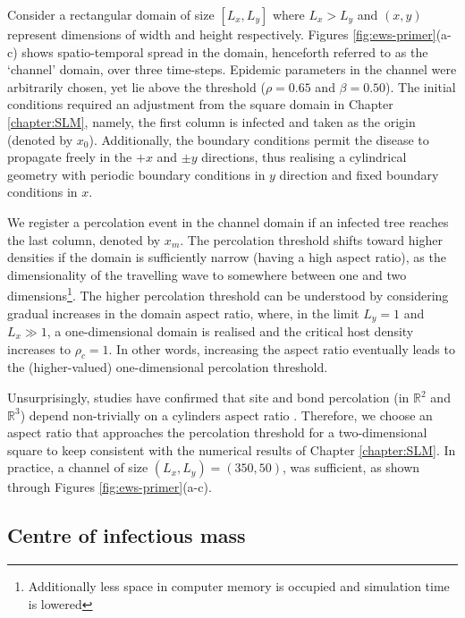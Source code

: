 Consider a rectangular domain of size $[L_x, L_y]$ where $L_x>L_y$ and $(x, y)$ represent dimensions of width and height respectively.
Figures \ref{fig:ews-primer}(a-c) shows spatio-temporal spread in the domain, henceforth referred to as the `channel' domain, over three time-steps.
Epidemic parameters in the channel were arbitrarily chosen, yet lie above the threshold ($\rho=0.65$ and $\beta=0.50$).
The initial conditions required an adjustment from the square domain in Chapter \ref{chapter:SLM}, namely, the first column is infected and taken as the origin (denoted by $x_0$).
Additionally, the boundary conditions permit the disease to propagate freely in the $+x$ and $\pm y$ directions, thus realising a cylindrical geometry with periodic boundary conditions in $y$ direction and fixed boundary conditions in $x$.

We register a percolation event in the channel domain if an infected tree reaches the last column, denoted by $x_m$.
The percolation threshold shifts toward higher densities if the domain is sufficiently narrow (having a high aspect ratio), as the dimensionality of the travelling wave to somewhere between one and two dimensions\footnote{Additionally less space in computer memory is occupied and simulation time is lowered}. 
The higher percolation threshold can be understood by considering gradual increases in the domain aspect ratio, 
where, in the limit $L_y = 1$ and $L_x \gg 1$, a one-dimensional domain is realised and the critical host density increases to $\rho_c=1$.
In other words, increasing the aspect ratio eventually leads to the (higher-valued) one-dimensional percolation threshold.

Unsurprisingly, studies have confirmed that site and bond percolation (in $\mathbb{R}^2$ and  $\mathbb{R}^3$) depend non-trivially on a cylinders aspect ratio \cite{sangare2009continuum}.
Therefore, we choose an aspect ratio that approaches the percolation threshold for a two-dimensional square to keep consistent with the numerical results of Chapter \ref{chapter:SLM}. 
In practice, a channel of size $(L_x, L_y) = (350, 50)$, was sufficient, as shown through Figures \ref{fig:ews-primer}(a-c). 


\subsection{Centre of infectious mass}

